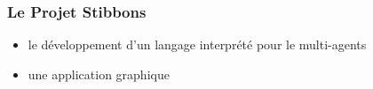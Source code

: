 \begin{frame}
\frametitle{Le Projet Stibbons}
\begin{itemize}
\item le développement d'un langage interprété pour le multi-agents
\item une application graphique 
\end{itemize}
\end{frame}
